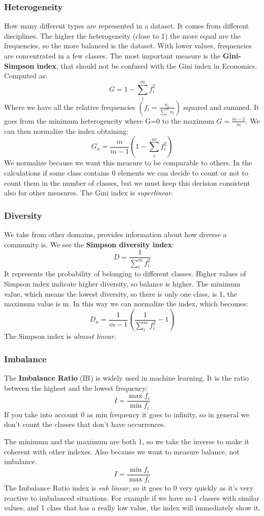 \subsubsection{Heterogeneity}
How many different types are represented in a dataset. It comes from different disciplines. The higher the heterogeneity (close to 1) the more equal are the frequencies, so the more balanced is the dataset. With lower values, frequencies are concentrated in a few classes. The most important measure is the \textbf{Gini-Simpson index}, that should not be confused with the Gini index in Economics. Computed as:
$$
    G = 1 - \sum_i^m f_i^2
$$
Where we have all the relative frequencies $\left(f_i = \frac{n_i}{\sum_i^m n_i}\right)$ squared and summed. It goes from the minimum heterogeneity where G=0 to the maximum $G=\frac{m-1}{m}$. We can then normalize the index obtaining:
$$
G_n = \frac{m}{m-1}\left(1 - \sum_i^m f_i^2 \right)
$$
We normalize because we want this measure to be comparable to others. In the calculations if some class contains 0 elements we can decide to count or not to count them in the number of classes, but we must keep this decision consistent also for other measures.
The Gini index is \textit{superlinear}.
\subsubsection{Diversity}
We take from other domains, provides information about how diverse a community is. We see the \textbf{Simpson diversity index}:
$$
    D = \frac{1}{\sum_i^m f_i^2}
$$
It represents the probability of belonging to different classes. Higher values of Simpson index indicate higher diversity, so balance is higher.
The minimum value, which means the lowest diversity, so there is only one class, is 1, the maximum value is m. In this way we can normalize the index, which becomes:
$$
    D_n = \frac{1}{m-1} \left(\frac{1}{\sum_i^m f_i^2} -1 \right)
$$
The Simpson index is \textit{almost linear}.
\subsubsection{Imbalance}
The \textbf{Imbalance Ratio} (IR) is widely used in machine learning. It is the ratio between the highest and the lowest frequency:
$$
    I = \frac{\max f_i}{\min f_i}
$$
If you take into account 0 as min frequency it goes to infinity, so in general we don't count the classes that don't have occurrences. 

The minimum and the maximum are both 1, so we take the inverse to make it coherent with other indexes. Also because we want to measure balance, not imbalance.
$$
    I = \frac{\min f_i}{\max f_i}
$$
The Imbalance Ratio index is \textit{sub linear}, so it goes to 0 very quickly as it's very reactive to imbalanced situations. For example if we have m-1 classes with similar values, and 1 class that has a really low value, the index will immediately show it.
